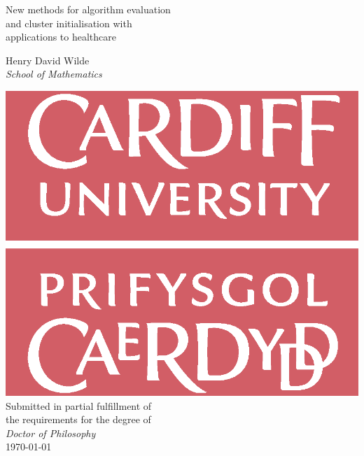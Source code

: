 \begin{titlepage}
    \begin{center}

    \huge%
    \vspace*{2em}
    
    {%
        New methods for algorithm evaluation\\
        and cluster initialisation with\\
        applications to healthcare
    }

    \LARGE%
    \vspace{5em}
    Henry David Wilde\\
    \emph{School of Mathematics}\\[1ex]

    \vfill

    \includegraphics[width=.3\linewidth]{logo}\\[1ex]

    \vfill
    \Large%
    Submitted in partial fulfillment of\\
    the requirements for the degree of\\
    \emph{Doctor of Philosophy}\\[2em]

    \LARGE%
    \monthyeardate\today
    \end{center}
\end{titlepage}
